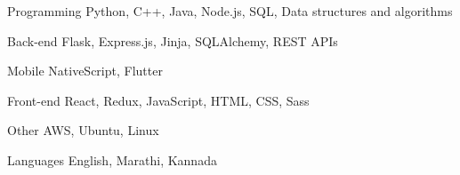 

\begin{cvskills}

  \cvskill
    {Programming} %
    {Python, C++, Java, Node.js, SQL, Data structures and algorithms} %

  \cvskill
    {Back-end} %
    {Flask, Express.js, Jinja, SQLAlchemy, REST APIs} %
    
  \cvskill
    {Mobile} %
    {NativeScript, Flutter} %

  \cvskill
    {Front-end} %
    {React, Redux, JavaScript, HTML, CSS, Sass} %
    
  \cvskill
    {Other} %
    {AWS, Ubuntu, Linux} %
    


  \cvskill
    {Languages} %
    {English, Marathi, Kannada} %

\end{cvskills}

